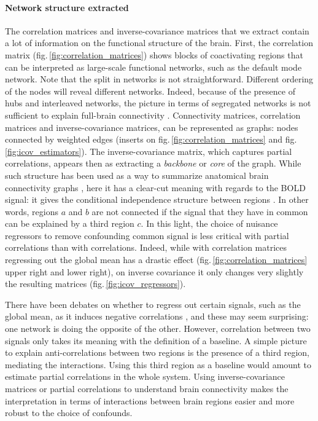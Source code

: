 \documentclass[5p]{elsarticle}
\begin{document}

\paragraph{Network structure extracted}
%
The correlation matrices and inverse-covariance matrices that we extract
contain a lot of information on the functional structure of the brain.
First, the correlation matrix (fig.\,\ref{fig:correlation_matrices})
shows blocks of coactivating regions that can be interpreted as
large-scale functional networks, such as the default mode network. Note
that the split in networks is not straightforward. Different ordering of the
nodes will reveal different networks. 
Indeed, because of the presence of
hubs and interleaved networks, the picture in terms of segregated networks
is not sufficient to explain full-brain connectivity
\cite{varoquaux2012}. Connectivity matrices, correlation matrices and
inverse-covariance matrices, can be represented as graphs: nodes connected
by weighted edges (inserts on fig.\,\ref{fig:correlation_matrices} and
fig.\,\ref{fig:icov_estimators}). The inverse-covariance matrix, which
captures partial correlations, appears then as extracting a
\emph{backbone} or \emph{core} of the graph.
While such structure has
been used as a way to summarize anatomical brain connectivity graphs
\cite{hagmann2008}, here it has a clear-cut meaning with regards to
the BOLD signal: it gives the conditional independence structure between
regions \cite{varoquaux2012}. In other words, regions $a$ and $b$ are
not connected if the signal that they have in common can be explained by
a third region $c$. In this light, the choice of nuisance regressors to
remove confounding common signal is less critical with partial
correlations than with correlations. Indeed, while with
correlation matrices regressing out the global mean has a drastic effect
(fig.\,\ref{fig:correlation_matrices} upper right and lower right), on
inverse covariance it only changes very slightly the resulting matrices
(fig.\,\ref{fig:icov_regressors}).

There have been debates on whether to
regress out certain signals, such as the global mean,  as it induces
negative correlations \cite{murphy2009,chang2009,fox2009}, and these may seem
surprising: one network is doing the opposite of the other. However,
correlation between two signals only takes its meaning with the
definition of a baseline. A simple picture to explain anti-correlations
between two regions is the presence of a third region, mediating the
interactions. Using this third region as a baseline would amount to
estimate partial correlations in the whole system. Using 
inverse-covariance matrices or partial correlations to understand brain
connectivity makes the interpretation in terms of interactions between
brain regions easier and more robust to the choice of confounds.
\end{document}
